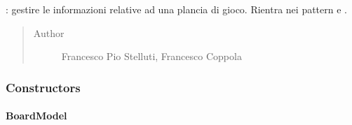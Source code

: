 \documentclass[letterpaper,10pt,italian,openany,oneside]{sphinxmanual}
\begin{document}
\begin{fulllineitems}
\label{\detokenize{source/it/unicam/cs/pa/mastermind/gamecore/BoardModel:it.unicam.cs.pa.mastermind.gamecore.BoardModel}}
: gestire le informazioni relative ad una plancia di gioco. Rientra nei pattern  e .
\begin{quote}\begin{description}
\item[{Author}] \leavevmode
Francesco Pio Stelluti, Francesco Coppola

\end{description}\end{quote}

\end{fulllineitems}



\subsubsection{Constructors}
\label{\detokenize{source/it/unicam/cs/pa/mastermind/gamecore/BoardModel:constructors}}

\paragraph{BoardModel}
\label{\detokenize{source/it/unicam/cs/pa/mastermind/gamecore/BoardModel:id1}}
\end{document}
